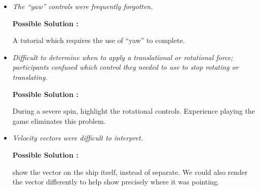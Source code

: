 \begin{itemize}
	\item \emph{The ``yaw'' controls were frequently forgotten.}
        
        \textbf{Possible Solution : } \parbox[t]{5in}{A tutorial which requires the use of ``yaw'' to complete.}

	\item \emph{Difficult to determine when to apply a translational or rotational force; participants confused which control they needed to use to stop rotating or translating.}
        
        \textbf{Possible Solution : } \parbox[t]{5in}{During a severe spin, highlight the rotational controls.  Experience playing the game eliminates this problem.}

	\item \emph{Velocity vectors were difficult to interpret.}
        
        \textbf{Possible Solution : } \parbox[t]{5in}{show the vector on the ship itself, instead of separate.  We could also render the vector differently to help show precisely where it was pointing.}

\end{itemize}





